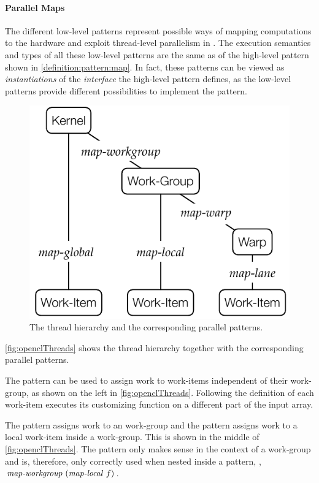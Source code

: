 \paragraph{Parallel Maps}
The different low-level \OpenCL \map patterns represent possible ways of mapping computations to the hardware and exploit thread-level parallelism in \OpenCL.
The execution semantics and types of all these low-level \OpenCL \map patterns are the same as of the high-level \map pattern shown in \autoref{definition:pattern:map}.
In fact, these patterns can be viewed as \emph{instantiations} of the \emph{interface} the high-level \map pattern defines, as the low-level \OpenCL patterns provide different possibilities to implement the \map pattern.

\begin{figure}[t]
  \centering
  \includegraphics[width=.65\textwidth]{Figures/ThreadHierarchy.pdf}
  \caption{The \OpenCL thread hierarchy and the corresponding parallel \map patterns.}
  \label{fig:openclThreads}
\end{figure}
\autoref{fig:openclThreads} shows the \OpenCL thread hierarchy together with the corresponding parallel \map patterns.

The \mapGlobal pattern can be used to assign work to work-items independent of their work-group, as shown on the left in \autoref{fig:openclThreads}.
Following the definition of \map each \OpenCL work-item executes its customizing function on a different part of the input array.

The \mapWorkgroup pattern assigns work to an \OpenCL work-group and the \mapLocal pattern assigns work to a local work-item inside a work-group.
This is shown in the middle of \autoref{fig:openclThreads}.
The \mapLocal pattern only makes sense in the context of a work-group and is, therefore, only correctly used when nested inside a \mapWorkgroup pattern, \eg, $\text{\textit{map-workgroup}}\ (\text{\textit{map-local}}\ f)$.

